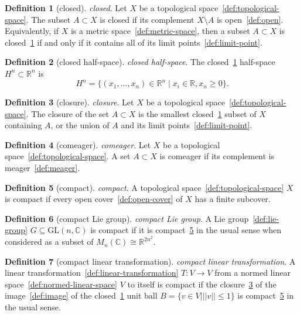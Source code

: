\documentclass[12pt,a4paper]{article}
\theoremstyle{definition}
\newtheorem{definition}{Definition}
\begin{document}
\begin{definition}[closed]\label{def:closed}
\emph{closed}. Let $X$ be a topological space~\ref{def:topological-space}. The subset $A \subset X$ is closed if its complement $X\setminus A$ is open~\ref{def:open}. Equivalently, if $X$ is a metric space~\ref{def:metric-space}, then a subset $A \subset X$ is closed~\ref{def:closed} if and only if it contains all of its limit points~\ref{def:limit-point}.
\end{definition}

\begin{definition}[closed half-space]\label{def:closed-half-space}
\emph{closed half-space}. The closed~\ref{def:closed} half-space $H^n \subset\mathbb R^n$ is $$H^n = \{(x_1,\dots,x_n)\in\mathbb R^n\mid x_i \in \mathbb R, x_n \geq 0\}.$$
\end{definition}

\begin{definition}[closure]\label{def:closure}
\emph{closure}. Let $X$ be a topological space~\ref{def:topological-space}. The closure of the set $A \subset X$ is the smallest closed~\ref{def:closed} subset of $X$ containing $A$, or the union of $A$ and its limit points~\ref{def:limit-point}.
\end{definition}

\begin{definition}[comeager]\label{def:comeager}
\emph{comeager}. Let $X$ be a topological space~\ref{def:topological-space}. A set $A\subset X$ is comeager if its complement is meager~\ref{def:meager}.
\end{definition}

\begin{definition}[compact]\label{def:compact}
\emph{compact}. A topological space~\ref{def:topological-space} $X$ is compact if every open cover~\ref{def:open-cover} of $X$ has a finite subcover.
\end{definition}

\begin{definition}[compact Lie group]\label{def:compact-lie-group}
\emph{compact Lie group}. A Lie group~\ref{def:lie-group} $G\subseteq \text{GL}(n,\mathbb C)$ is compact if it is compact~\ref{def:compact} in the usual sense when considered as a subset of $M_n(\mathbb C) \cong \mathbb R^{2n^2}.$
\end{definition}

\begin{definition}[compact linear transformation]\label{def:compact-linear-transformation}
\emph{compact linear transformation}. A linear transformation~\ref{def:linear-transformation} $T:V\to V$ from a normed linear space~\ref{def:normed-linear-space} $V$ to itself is compact if the closure~\ref{def:closure} of the image~\ref{def:image} of the closed~\ref{def:closed} unit ball $B = \{v \in V \mid \vert \vert v\vert \vert  \leq 1\}$ is compact~\ref{def:compact} in the usual sense.
\end{definition}
\end{document}
